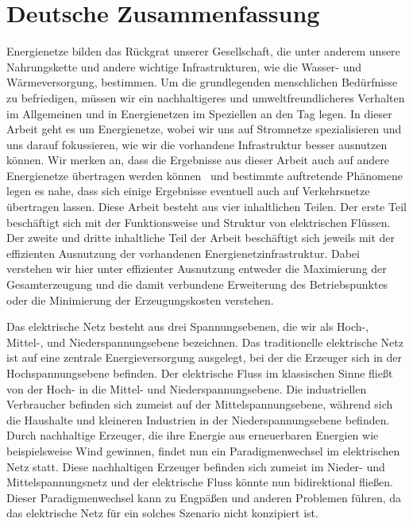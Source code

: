 \chapter{Deutsche Zusammenfassung}
% 
Energienetze bilden das R{\"u}ckgrat unserer Gesellschaft, die unter anderem
unsere Nahrungskette und andere wichtige Infrastrukturen, wie die Wasser- und
W{\"a}rmeversorgung, bestimmen. Um die grundlegenden menschlichen
Bed{\"u}rfnisse zu befriedigen, m{\"u}ssen wir ein nachhaltigeres und
umweltfreundlicheres Verhalten im Allgemeinen und in Energienetzen im Speziellen
an den Tag legen. In dieser Arbeit geht es um Energienetze, wobei wir uns auf
Stromnetze spezialisieren und uns darauf fokussieren, wie wir die vorhandene
Infrastruktur besser ausnutzen k{\"o}nnen. Wir merken an, dass die Ergebnisse
aus dieser Arbeit auch auf andere Energienetze {\"u}bertragen werden
k{\"o}nnen~\parencite{Gro19} und bestimmte auftretende Ph{\"a}nomene legen es
nahe, dass sich einige Ergebnisse eventuell auch auf Verkehrsnetze
{\"u}bertragen lassen. Diese Arbeit besteht aus vier inhaltlichen Teilen. Der
erste Teil besch{\"a}ftigt sich mit der Funktionsweise und Struktur von
elektrischen Fl{\"u}{ss}en. Der zweite und dritte inhaltliche Teil der Arbeit
besch{\"a}ftigt sich jeweils mit der effizienten Ausnutzung der vorhandenen
Energienetzinfrastruktur. Dabei verstehen wir hier unter effizienter Ausnutzung
entweder die Maximierung der Gesamterzeugung und die damit verbundene
Erweiterung des Betriebspunktes oder die Minimierung der Erzeugungskosten
verstehen.

Das elektrische Netz besteht aus drei Spannungsebenen, die wir als Hoch-,
Mittel-, und Niederspannungsebene bezeichnen. Das traditionelle elektrische Netz
ist auf eine zentrale Energieversorgung ausgelegt, bei der die Erzeuger sich in
der Hochspannungsebene befinden. Der elektrische Fluss im klassischen Sinne
flie{\ss}t von der Hoch- in die Mittel- und Niederspannungsebene. Die
industriellen Verbraucher befinden sich zumeist auf der Mittelspannungsebene,
w{\"a}hrend sich die Haushalte und kleineren Industrien in der
Niederspannungsebene befinden. Durch nachhaltige Erzeuger, die ihre Energie aus
erneuerbaren Energien wie beispielsweise Wind gewinnen, findet nun ein
Paradigmenwechsel im elektrischen Netz statt. Diese nachhaltigen Erzeuger
befinden sich zumeist im Nieder- und Mittelspannungsnetz und der elektrische
Fluss k\"onnte nun bidirektional flie{\ss}en. Dieser Paradigmenwechsel kann zu
Engp\"a{\ss}en und anderen Problemen f{\"u}hren, da das elektrische Netz f\"ur
ein solches Szenario nicht konzipiert ist.

